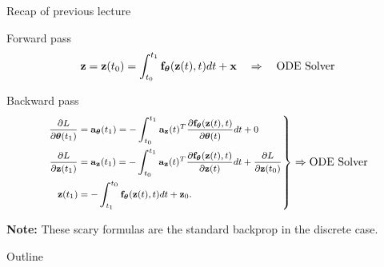 \begin{frame}{Recap of previous lecture}
	\begin{block}{Forward pass}
		\vspace{-0.3cm}
		\[
		\mathbf{z} = \mathbf{z}(t_0) = \int^{t_1}_{t_0} \mathbf{f}_{\boldsymbol{\theta}}(\mathbf{z}(t), t) d t  + \mathbf{x} \quad \Rightarrow \quad \text{ODE Solver}
		\]
		\vspace{-0.4cm}
	\end{block}
	\begin{block}{Backward pass}
		\vspace{-0.5cm}
		\begin{equation*}
			\left.
			{\footnotesize 
				\begin{aligned}
					\frac{\partial L}{\partial \boldsymbol{\theta}(t_1)} &= \mathbf{a}_{\boldsymbol{\theta}}(t_1) =  - \int_{t_0}^{t_1} \mathbf{a}_{\mathbf{z}}(t)^T \frac{\partial \mathbf{f}_{\boldsymbol{\theta}}(\mathbf{z}(t), t)}{\partial \boldsymbol{\theta}(t)} dt + 0 \\
					\frac{\partial L}{\partial \mathbf{z}(t_1)} &= \mathbf{a}_{\mathbf{z}}(t_1) =  - \int_{t_0}^{t_1} \mathbf{a}_{\mathbf{z}}(t)^T \frac{\partial \mathbf{f}_{\boldsymbol{\theta}}(\mathbf{z}(t), t)}{\partial \mathbf{z}(t)} dt + \frac{\partial L}{\partial \mathbf{z}(t_0)} \\
					\mathbf{z}(t_1) &= - \int^{t_0}_{t_1} \mathbf{f}_{\boldsymbol{\theta}}(\mathbf{z}(t), t) d t  + \mathbf{z}_0.
				\end{aligned}
			}
			\right\rbrace
			\Rightarrow
			\text{ODE Solver}
		\end{equation*}
		\vspace{-0.4cm} 
	\end{block}
	\textbf{Note:} These scary formulas are the standard backprop in the discrete case.
\end{frame}
\begin{frame}{Outline}
	\tableofcontents
\end{frame}
